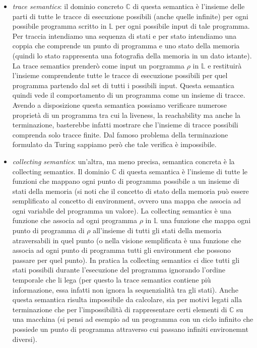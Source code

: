 \begin{itemize}
    \item \textit{trace semantics}: il dominio concreto \(\mathbb{C}\) di questa semantica è l'insieme delle parti di tutte le tracce di esecuzione possibili (anche quelle infinite) per ogni possibile programma scritto in \(\mathbb{L}\) per ogni possibile input di tale programma. Per traccia intendiamo una sequenza di stati e per stato intendiamo una coppia che comprende un punto di programma e uno stato della memoria (quindi lo stato rappresenta una fotografia della memoria in un dato istante). La trace semantics prenderò come input un porgramma \(\rho\) in \(\mathbb{L}\) e restituirà l'insieme comprendente tutte le tracce di esecuzione possibili per quel programma partendo dal set di tutti i possibili input. Questa semantica quindi vede il comportamento di un programma come un insieme di tracce. Avendo a disposizione questa semantica possiamo verificare numerose proprietà di un programma tra cui la liveness, la reachability ma anche la terminazione, basterebbe infatti mostrare che l'insieme di tracce possibili comprenda solo tracce finite. Dal famoso problema della terminazione formulato da Turing sappiamo però che tale verifica è impossibile.
    \item \textit{collecting semantics}: un'altra, ma meno precisa, semantica concreta è la collecting semantics. Il dominio \(\mathbb{C}\) di questa semantica è l'insieme di tutte le funzioni che mappano ogni punto di programma possibile a un insieme di stati della memoria (si noti che il concetto di stato della memoria può essere semplificato al concetto di environment, ovvero una mappa che associa ad ogni variabile del programma un valore). La collecting semantics è una funzione che associa ad ogni programma \(\rho\) in \(\mathbb{L}\) una funzione che mappa ogni punto di programma di \(\rho\) all'insieme di tutti gli stati della memoria atraversabili in quel punto (o nella visione semplificata è una funzione che associa ad ogni punto di programma tutti gli environment che possono passare per quel punto). In pratica la collecting semantics ci dice tutti gli stati possibili durante l'esecuzione del programma ignorando l'ordine temporale che li lega (per questo la trace semantics contiene più informazione, essa infatti non ignora la sequenzialità tra gli stati). Anche questa semantica risulta impossibile da calcolare, sia per motivi legati alla terminazione che per l'impossibilità di rappresentare certi elementi di \(\mathbb{C}\) su una macchina (si pensi ad esempio ad un programma con un ciclo infinito che possiede un punto di programma attraverso cui passano infiniti environemnt diversi). 
\end{itemize}

